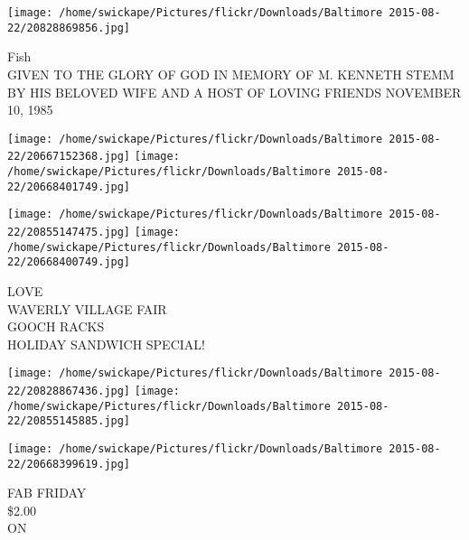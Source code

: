 \documentclass[10pt,letterpaper]{article}
\begin{document}
\vspace{0.25in}
\texttt{[image: /home/swickape/Pictures/flickr/Downloads/Baltimore 2015-08-22/20828869856.jpg]}

Fish\\
GIVEN TO THE GLORY OF GOD IN MEMORY OF M. KENNETH STEMM BY HIS BELOVED WIFE AND A HOST OF LOVING FRIENDS NOVEMBER 10, 1985
\pagebreak

\texttt{[image: /home/swickape/Pictures/flickr/Downloads/Baltimore 2015-08-22/20667152368.jpg]}
\texttt{[image: /home/swickape/Pictures/flickr/Downloads/Baltimore 2015-08-22/20668401749.jpg]}

\texttt{[image: /home/swickape/Pictures/flickr/Downloads/Baltimore 2015-08-22/20855147475.jpg]}
\texttt{[image: /home/swickape/Pictures/flickr/Downloads/Baltimore 2015-08-22/20668400749.jpg]}

LOVE\\
WAVERLY VILLAGE FAIR\\
GOOCH RACKS\\
HOLIDAY SANDWICH SPECIAL!
\pagebreak

\texttt{[image: /home/swickape/Pictures/flickr/Downloads/Baltimore 2015-08-22/20828867436.jpg]}
\texttt{[image: /home/swickape/Pictures/flickr/Downloads/Baltimore 2015-08-22/20855145885.jpg]}

\texttt{[image: /home/swickape/Pictures/flickr/Downloads/Baltimore 2015-08-22/20668399619.jpg]}

FAB FRIDAY\\
\$2.00\\
ON
\pagebreak
\end{document}
